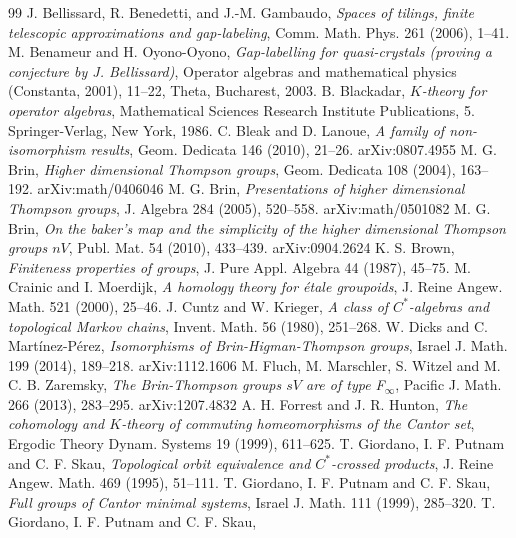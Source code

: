 \documentclass[11pt]{article}
\theoremstyle{definition}
\numberwithin{equation}{section}
\begin{document}
\begin{thebibliography}{99}
J. Bellissard, R. Benedetti, and J.-M. Gambaudo, 
\textit{Spaces of tilings, finite telescopic approximations 
and gap-labeling}, 
Comm. Math. Phys. 261 (2006), 1--41. 
M. Benameur and H. Oyono-Oyono, 
\textit{Gap-labelling for quasi-crystals 
(proving a conjecture by J. Bellissard)}, 
Operator algebras and mathematical physics (Constanta, 2001), 11--22, 
Theta, Bucharest, 2003. 
B. Blackadar, 
\textit{$K$-theory for operator algebras}, 
Mathematical Sciences Research Institute Publications, 5. 
Springer-Verlag, New York, 1986. 
C. Bleak and D. Lanoue, 
\textit{A family of non-isomorphism results}, 
Geom. Dedicata 146 (2010), 21--26. 
arXiv:0807.4955
M. G. Brin, 
\textit{Higher dimensional Thompson groups}, 
Geom. Dedicata 108 (2004), 163--192. 
arXiv:math/0406046
M. G. Brin, 
\textit{Presentations of higher dimensional Thompson groups}, 
J. Algebra 284 (2005), 520--558. 
arXiv:math/0501082
M. G. Brin, 
\textit{On the baker's map and 
the simplicity of the higher dimensional Thompson groups $nV$}, 
Publ. Mat. 54 (2010), 433--439. 
arXiv:0904.2624
K. S. Brown, 
\textit{Finiteness properties of groups}, 
J. Pure Appl. Algebra 44 (1987), 45--75. 
M. Crainic and I. Moerdijk, 
\textit{A homology theory for \'etale groupoids}, 
J. Reine Angew. Math. 521 (2000), 25--46. 
J. Cuntz and W. Krieger, 
\textit{A class of $C^*$-algebras and topological Markov chains}, 
Invent. Math. 56 (1980), 251--268. 
W. Dicks and C. Mart\'inez-P\'erez, 
\textit{Isomorphisms of Brin-Higman-Thompson groups}, 
Israel J. Math. 199 (2014), 189--218. 
arXiv:1112.1606
M. Fluch, M. Marschler, S. Witzel and M. C. B. Zaremsky, 
\textit{The Brin-Thompson groups $sV$ are of type F$_\infty$}, 
Pacific J. Math. 266 (2013), 283--295. 
arXiv:1207.4832
A. H. Forrest and J. R. Hunton, 
\textit{The cohomology and $K$-theory of commuting homeomorphisms 
of the Cantor set}, 
Ergodic Theory Dynam. Systems 19 (1999), 611--625. 
T. Giordano, I. F. Putnam and C. F. Skau, 
\textit{Topological orbit equivalence and $C^*$-crossed products}, 
J. Reine  Angew. Math. 469 (1995), 51--111. 
T. Giordano, I. F. Putnam and C. F. Skau, 
\textit{Full groups of Cantor minimal systems}, 
Israel J. Math. 111 (1999), 285--320. 
T. Giordano, I. F. Putnam and C. F. Skau, 

\end{thebibliography}
\end{document}
